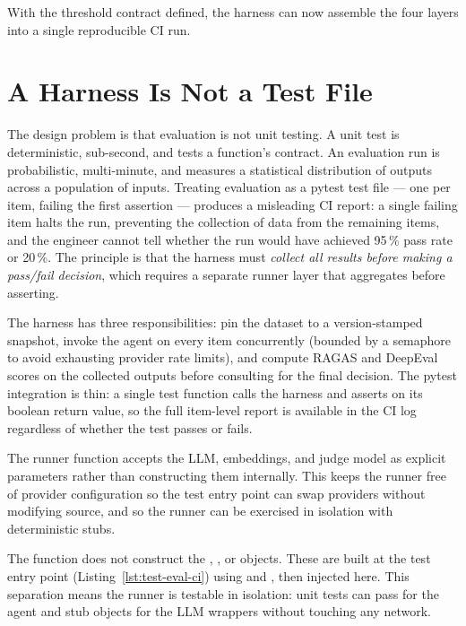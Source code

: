 With the threshold contract defined, the harness can now assemble the four
layers into a single reproducible CI run.

\section{A Harness Is Not a Test File}
\label{sec:ci-harness}

The design problem is that evaluation is not unit testing.  A unit test is
deterministic, sub-second, and tests a function's contract.  An evaluation
run is probabilistic, multi-minute, and measures a statistical distribution
of outputs across a population of inputs.  Treating evaluation as a pytest
test file --- one  per item, failing the first assertion ---
produces a misleading CI report: a single failing item halts the run,
preventing the collection of data from the remaining items, and the engineer
cannot tell whether the run would have achieved 95\,\% pass rate or 20\,\%.
The principle is that the harness must \emph{collect all results before
making a pass/fail decision}, which requires a separate runner layer that
aggregates before asserting.

The harness has three responsibilities: pin the dataset to a version-stamped
snapshot, invoke the agent on every item concurrently (bounded by a semaphore
to avoid exhausting provider rate limits), and compute RAGAS and DeepEval
scores on the collected outputs before consulting  for the
final decision.  The pytest integration is thin: a single test function calls
the harness and asserts on its boolean return value, so the full item-level
report is available in the CI log regardless of whether the test passes or
fails.

The runner function accepts the LLM, embeddings, and judge model as
explicit parameters rather than constructing them internally.  This keeps
the runner free of provider configuration so the test entry point can swap
providers without modifying source, and so the runner can be exercised
in isolation with deterministic stubs.

\begin{notebox}
The  function does not construct the ,
, or  objects.  These are built at the
test entry point (Listing~\ref{lst:test-eval-ci}) using 
and , then injected here.  This separation means
the runner is testable in isolation: unit tests can pass
 for the agent and stub objects for the
LLM wrappers without touching any network.
\end{notebox}

